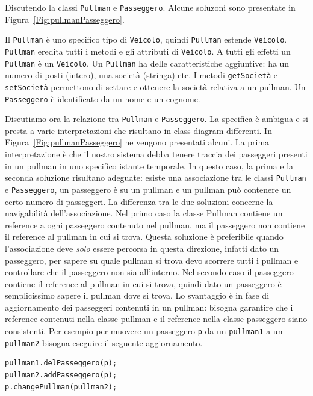 \documentclass{article}
\begin{document}
Discutendo la classi  \texttt{Pullman} e  \texttt{Passeggero}. Alcune soluzoni sono presentate in Figura~\ref{Fig:pullmanPasseggero}.

Il \texttt{Pullman} \`e uno specifico tipo di \texttt{Veicolo}, quindi \texttt{Pullman} estende  \texttt{Veicolo}. \texttt{Pullman} eredita tutti i metodi e gli attributi di \texttt{Veicolo}. A tutti gli effetti un \texttt{Pullman}  \`e un  \texttt{Veicolo}. Un \texttt{Pullman} ha delle caratteristiche  aggiuntive: ha un numero di posti (intero), una societ\`a (stringa) etc. I metodi \texttt{getSociet\`a} e \texttt{setSociet\`a} permettono di settare e ottenere la societ\`a relativa a un pullman. Un \texttt{Passeggero} \`e identificato da un nome e un cognome. 

Discutiamo ora la relazione tra \texttt{Pullman} e \texttt{Passeggero}. La specifica \`e ambigua e si presta a varie interpretazioni che risultano in class diagram differenti. In Figura~\ref{Fig:pullmanPasseggero} ne vengono presentati alcuni. La prima interpretazione \`e che il nostro sistema debba tenere traccia dei passeggeri presenti in un pullman in uno specifico istante temporale. In questo caso, la prima e la seconda soluzione risultano adeguate: esiste una associazione tra le classi \texttt{Pullman} e \texttt{Passeggero}, un passeggero \`e su un pullman e un pullman pu\`o contenere un certo numero di passeggeri. La differenza tra le due soluzioni concerne la navigabilit\`a dell'associazione. Nel primo caso la classe Pullman contiene un reference a ogni passeggero contenuto nel pullman, ma il passeggero non contiene il reference al pullman in cui si trova. Questa soluzione \`e preferibile quando l'associazione deve \emph{solo} essere percorsa in questa direzione, infatti dato un passeggero, per sapere su quale pullman si trova devo scorrere tutti i pullman e controllare che il passeggero non sia all'interno. Nel secondo caso il passeggero contiene il reference al pullman in cui si trova, quindi dato un passeggero \`e semplicissimo sapere il pullman dove si trova. Lo svantaggio \`e in fase di aggiornamento dei passeggeri contenuti in un pullman: bisogna garantire che i reference contenuti nella classe pullman e il reference nella classe passeggero siano consistenti. Per esempio per muovere un passeggero \texttt{p} da un \texttt{pullman1} a un \texttt{pullman2} bisogna eseguire il seguente aggiornamento.

\begin{lstlisting}
pullman1.delPasseggero(p);
pullman2.addPasseggero(p);
p.changePullman(pullman2);
\end{lstlisting}
\end{document}
